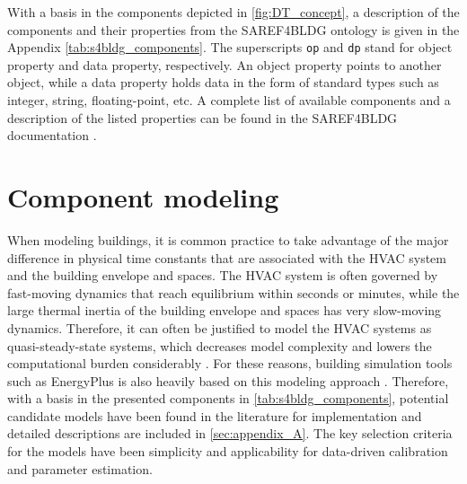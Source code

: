 

























With a basis in the components depicted in \autoref{fig:DT_concept}, a description of the components and their properties from the SAREF4BLDG ontology is given in the Appendix \autoref{tab:s4bldg_components}. The superscripts \texttt{op} and \texttt{dp} stand for object property and data property, respectively. An object property points to another object, while a data property holds data in the form of standard types such as integer, string, floating-point, etc. A complete list of available components and a description of the listed properties can be found in the SAREF4BLDG documentation \cite{saref4bldg}. 


\section{Component modeling}
\label{sec:component_models}

When modeling buildings, it is common practice to take advantage of the major difference in physical time constants that are associated with the HVAC system and the building envelope and spaces. The HVAC system is often governed by fast-moving dynamics that reach equilibrium within seconds or minutes, while the large thermal inertia of the building envelope and spaces has very slow-moving dynamics. Therefore, it can often be justified to model the HVAC systems as quasi-steady-state systems, which decreases model complexity and lowers the computational burden considerably \cite{li2013a, jorissen2015a}. For these reasons, building simulation tools such as EnergyPlus is also heavily based on this modeling approach \cite{energy2021a}. Therefore, with a basis in the presented components in \autoref{tab:s4bldg_components}, potential candidate models have been found in the literature for implementation and detailed descriptions are included in \autoref{sec:appendix_A}. The key selection criteria for the models have been simplicity and applicability for data-driven calibration and parameter estimation. 





